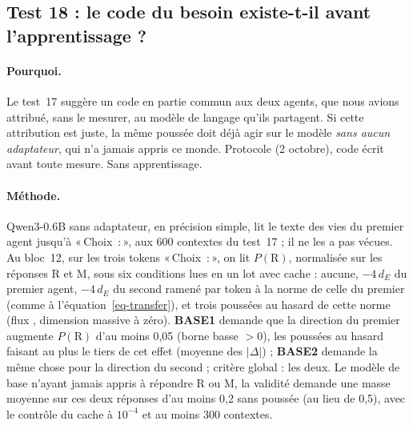 \documentclass[11pt,a4paper]{article}
\newcommand{\Choix}{«\,Choix~:\,»}
\newcommand{\dE}{d_{E}}
\newcommand{\code}[1]{\texttt{\detokenize{#1}}}
\begin{document}
\subsection{Test 18 : le code du besoin existe-t-il avant l'apprentissage ?}
\label{sec-t18}

\paragraph{Pourquoi.} Le test~17 suggère un code en partie commun aux deux agents, que nous
avions attribué, sans le mesurer, au modèle de langage qu'ils partagent. Si cette attribution
est juste, la même poussée doit déjà agir sur le modèle \emph{sans aucun adaptateur}, qui n'a
jamais appris ce monde. Protocole \code{b5b9a6f} (2 octobre), code \code{a3d4d37} écrit avant
toute mesure. Sans apprentissage.

\paragraph{Méthode.} Qwen3-0.6B sans adaptateur, en précision simple, lit le texte des vies du
premier agent jusqu'à \Choix{}, aux 600 contextes du test~17 ; il ne les a pas vécues. Au
bloc~12, sur les trois tokens \Choix{}, on lit $P(\mathrm R)$, normalisée sur les réponses R et
M, sous six conditions lues en un lot avec cache : aucune, $-4\,\dE$ du premier agent, $-4\,\dE$
du second ramené par token à la norme de celle du premier (comme à
l'équation~\eqref{eq-transfer}), et trois poussées au hasard de cette norme (flux
\code{[270926, 38, i]}, dimension massive à zéro). \textbf{BASE1} demande que la direction du
premier augmente $P(\mathrm R)$ d'au moins 0,05 (borne basse $>0$), les poussées au hasard
faisant au plus le tiers de cet effet (moyenne des $|\Delta|$) ; \textbf{BASE2} demande la même
chose pour la direction du second ; critère global : les deux. Le modèle de base n'ayant jamais
appris à répondre R ou M, la validité demande une masse moyenne sur ces deux réponses d'au moins
0,2 sans poussée (au lieu de 0,5), avec le contrôle du cache à $10^{-4}$ et au moins
300 contextes.
\end{document}
